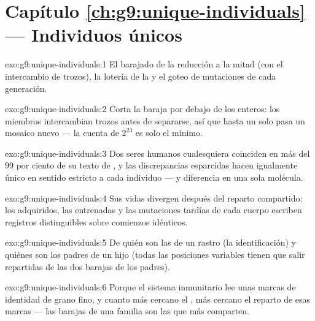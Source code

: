 \section*{Capítulo \ref{ch:g9:unique-individuals} --- Individuos únicos}

\begin{solution}{exo:g9:unique-individuals:1}
El barajado de la reducción a la mitad (con el intercambio de trozos),
la lotería de la  y el goteo de mutaciones de cada
generación.
\end{solution}

\begin{solution}{exo:g9:unique-individuals:2}
Corta la baraja por debajo de los  enteros: los miembros
intercambian trozos antes de separarse, así que hasta un solo 
pasa un mosaico nuevo --- la cuenta de $2^{23}$ es solo el mínimo.
\end{solution}

\begin{solution}{exo:g9:unique-individuals:3}
Dos seres humanos cualesquiera coinciden en más del $99$ por ciento de
su texto de , y las discrepancias esparcidas hacen igualmente único
en sentido estricto a cada individuo ---  y diferencia en una
sola molécula.
\end{solution}

\begin{solution}{exo:g9:unique-individuals:4}
Sus vidas divergen después del reparto compartido: los 
adquiridos, las  entrenadas y las mutaciones tardías de cada
cuerpo escriben registros distinguibles sobre comienzos idénticos.
\end{solution}

\begin{solution}{exo:g9:unique-individuals:5}
De quién son las  de un rastro (la identificación) y quiénes son
los padres de un hijo (todas las posiciones variables tienen que salir
repartidas de las dos barajas de los padres).
\end{solution}

\begin{solution}{exo:g9:unique-individuals:6}
Porque el sistema inmunitario lee unas marcas de identidad de grano
fino, y cuanto más cercano el , más cercano el reparto de
esas marcas --- las barajas de una familia son las que más comparten.
\end{solution}

